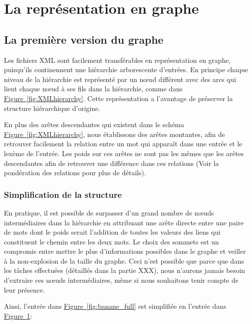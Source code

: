 \section{La représentation en graphe}


\subsection{La première version du graphe}

Les fichiers XML sont facilement transférables en représentation en graphe, 
puisqu'ils continennent une hiérarchie arborescente d'entrées.
En principe chaque niveau de la hiérarchie est représenté par un nœud différent 
avec des arcs qui lient chaque nœud à ses fils dans la hiérarchie, comme dans 
\hyperref[fig:XMLhierarchy]{Figure~\ref*{fig:XMLhierarchy}}. Cette 
représentation a l'avantage de préserver la structure hiérarchique d'origine.

En plus des arêtes descendantes qui existent dans le schéma 
\hyperref[fig:XMLhierarchy]{Figure~\ref*{fig:XMLhierarchy}}, nous établissons 
des arêtes montantes, afin de retrouver facilement la relation entre un mot qui 
apparaît dans une entrée et le lexème de l'entrée. Les poids sur ces arêtes ne 
sont pas les mêmes que les arêtes descendantes afin de retrouver une différence 
dans ces relations (Voir la pondération des relations pour plus de détails).


\subsubsection{Simplification de la structure}
En pratique, il est possible de surpasser d'un grand nombre de nœuds 
intermédiaires dans la hiérarchie en attribuant une arête directe entre une 
paire de mots dont le poids serait l'addition de toutes les valeurs des liens 
qui constituent le chemin entre les deux mots. Le choix des sommets est un 
compromis entre mettre le plus d'informations possibles dans le graphe et 
veiller à la non-explosion de la taille du graphe. Ceci n'est possible que 
parce que dans les tâches effectuées (détaillés dans la partie XXX), nous 
n'aurons jamais besoin d'extraire ces nœuds intermédiaires, même si nous 
souhaitons tenir compte de leur présence.

Ainsi, l'entrée dans \hyperref[fig:banane_full]{Figure~\ref*{fig:banane_full}} 
est simplifiée en l'entrée dans 
\hyperref[fig:banane_simple]{Figure~\ref*{fig:banane_simple}}:

\begin{figure}
\centering
\parbox{5cm}{
\def\svgscale{0.5}

\caption{}
\label{fig:banane_full}}
\qquad
\begin{minipage}{5cm}
\def\svgscale{0.5}

\caption{}
\label{fig:banane_simple}
\end{minipage}
\end{figure}

